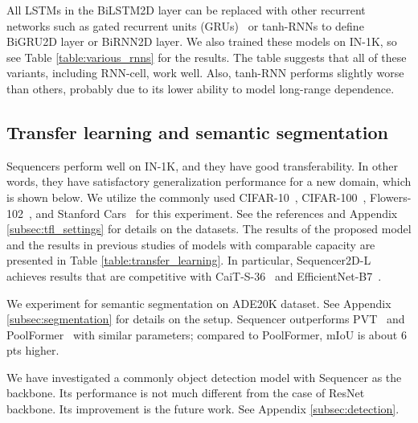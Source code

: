\documentclass{article}
\begin{document}
All LSTMs in the BiLSTM2D layer can be replaced with other recurrent networks such as gated recurrent units (GRUs)~\cite{cho2014properties} or tanh-RNNs to define BiGRU2D layer or BiRNN2D layer. We also trained these models on IN-1K, so see Table \ref{table:various_rnns} for the results. The table suggests that all of these variants, including RNN-cell, work well. Also, tanh-RNN performs slightly worse than others, probably due to its lower ability to model long-range dependence.

\subsection{Transfer learning and semantic segmentation}
\label{subsec:transfer_learning}
Sequencers perform well on IN-1K, and they have good transferability. In other words, they have satisfactory generalization performance for a new domain, which is shown below. We utilize the commonly used CIFAR-10~\cite{krizhevsky2009learning}, CIFAR-100~\cite{krizhevsky2009learning}, Flowers-102~\cite{nilsback2008automated}, and Stanford Cars~\cite{krause20133d} for this experiment. See the references and Appendix \ref{subsec:tfl_settings} for details on the datasets. The results of the proposed model and the results in previous studies of models with comparable capacity are presented in Table \ref{table:transfer_learning}. In particular, Sequencer2D-L achieves results that are competitive with CaiT-S-36~\cite{touvron2021going} and EfficientNet-B7~\cite{tan2019efficientnet}.

We experiment for semantic segmentation on ADE20K\cite{zhou2017scene} dataset. See Appendix \ref{subsec:segmentation} for details on the setup. Sequencer outperforms PVT~\cite{wang2021pyramid} and PoolFormer~\cite{yu2021metaformer} with similar parameters; compared to PoolFormer, mIoU is about 6 pts higher.

We have investigated a commonly object detection model with Sequencer as the backbone. Its performance is not much different from the case of ResNet~\cite{he2016deep} backbone. Its improvement is the future work. See Appendix \ref{subsec:detection}.
\end{document}
